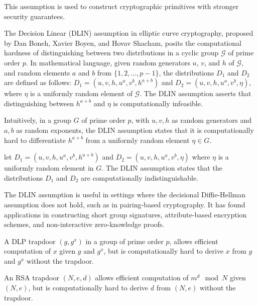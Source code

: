 \documentclass{iacrcc}
\begin{document}
This assumption is used to construct cryptographic primitives with stronger security guarantees.

The Decision Linear (DLIN) assumption in elliptic curve cryptography, proposed by Dan Boneh, Xavier Boyen, and Hovav Shacham, posits the computational hardness of distinguishing between two distributions in a cyclic group \(\mathcal{G}\) of prime order \(p\). In mathematical language, given random generators \(u\), \(v\), and \(h\) of \(\mathcal{G}\), and random elements \(a\) and \(b\) from \(\{1, 2, \ldots, p-1\}\), the distributions \(D_{1}\) and \(D_{2}\) are defined as follows: \(D_{1} = (u, v, h, u^{a}, v^{b}, h^{a+b})\) and \(D_{2} = (u, v, h, u^{a}, v^{b}, \eta)\), where \(\eta\) is a uniformly random element of \(\mathcal{G}\). The DLIN assumption asserts that distinguishing between \(h^{a+b}\) and \(\eta\) is computationally infeasible.

Intuitively, in a group \(G\) of prime order \(p\), with \(u, v, h\) as random generators and \(a, b\) as random exponents, the DLIN assumption states that it is computationally hard to differentiate \(h^{a+b}\) from a uniformly random element \(\eta \in G\).

\begin{definition}
let $D_1 = (u, v, h, u^a, v^b, h^{a+b})$ and $D_2 = (u, v, h, u^a, v^b, \eta)$ where $\eta$ is a uniformly random element in $G$. The DLIN assumption states that the distributions $D_1$ and $D_2$ are computationally indistinguishable.
\end{definition}

The DLIN assumption is useful in settings where the decisional Diffie-Hellman assumption does not hold, such as in pairing-based cryptography. It has found applications in constructing short group signatures, attribute-based encryption schemes, and non-interactive zero-knowledge proofs.

\begin{definition}
A DLP trapdoor $(g, g^x)$ in a group of prime order $p$, allows efficient computation of $x$ given $g$ and $g^x$, but is computationally hard to derive $x$ from $g$ and $g^x$ without the trapdoor.
\end{definition}

\begin{definition}
An RSA trapdoor $(N, e, d)$ allows efficient computation of $m^d \mod N$ given $(N, e)$, but is computationally hard to derive $d$ from $(N, e)$ without the trapdoor.
\end{definition}
\end{document}

